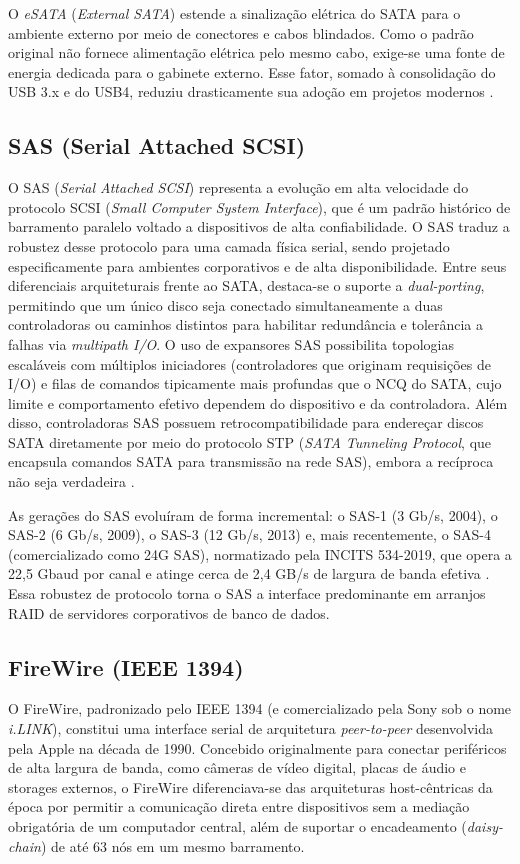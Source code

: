 \documentclass[11pt,a4paper]{article}
\begin{document}
O \emph{eSATA} (\emph{External SATA}) estende a sinalização elétrica do SATA para o ambiente externo por meio de conectores e cabos blindados. Como o padrão original não fornece alimentação elétrica pelo mesmo cabo, exige-se uma fonte de energia dedicada para o gabinete externo. Esse fator, somado à consolidação do USB 3.x e do USB4, reduziu drasticamente sua adoção em projetos modernos \cite{esata}.

\subsection{SAS (Serial Attached SCSI)}
O SAS (\emph{Serial Attached SCSI}) representa a evolução em alta velocidade do protocolo SCSI (\emph{Small Computer System Interface}), que é um padrão histórico de barramento paralelo voltado a dispositivos de alta confiabilidade. O SAS traduz a robustez desse protocolo para uma camada física serial, sendo projetado especificamente para ambientes corporativos e de alta disponibilidade. Entre seus diferenciais arquiteturais frente ao SATA, destaca-se o suporte a \emph{dual-porting}, permitindo que um único disco seja conectado simultaneamente a duas controladoras ou caminhos distintos para habilitar redundância e tolerância a falhas via \emph{multipath I/O}. O uso de expansores SAS possibilita topologias escaláveis com múltiplos iniciadores (controladores que originam requisições de I/O) e filas de comandos tipicamente mais profundas que o NCQ do SATA, cujo limite e comportamento efetivo dependem do dispositivo e da controladora. Além disso, controladoras SAS possuem retrocompatibilidade para endereçar discos SATA diretamente por meio do protocolo STP (\emph{SATA Tunneling Protocol}, que encapsula comandos SATA para transmissão na rede SAS), embora a recíproca não seja verdadeira \cite{sas4}.

As gerações do SAS evoluíram de forma incremental: o SAS-1 (3 Gb/s, 2004), o SAS-2 (6 Gb/s, 2009), o SAS-3 (12 Gb/s, 2013) e, mais recentemente, o SAS-4 (comercializado como 24G SAS), normatizado pela INCITS 534-2019, que opera a 22,5 Gbaud por canal e atinge cerca de 2,4 GB/s de largura de banda efetiva \cite{sas4}. Essa robustez de protocolo torna o SAS a interface predominante em arranjos RAID de servidores corporativos de banco de dados.

\subsection{FireWire (IEEE 1394)}
O FireWire, padronizado pelo IEEE 1394 (e comercializado pela Sony sob o nome \emph{i.LINK}), constitui uma interface serial de arquitetura \emph{peer-to-peer} desenvolvida pela Apple na década de 1990. Concebido originalmente para conectar periféricos de alta largura de banda, como câmeras de vídeo digital, placas de áudio e storages externos, o FireWire diferenciava-se das arquiteturas host-cêntricas da época por permitir a comunicação direta entre dispositivos sem a mediação obrigatória de um computador central, além de suportar o encadeamento (\emph{daisy-chain}) de até 63 nós em um mesmo barramento. 
\end{document}
